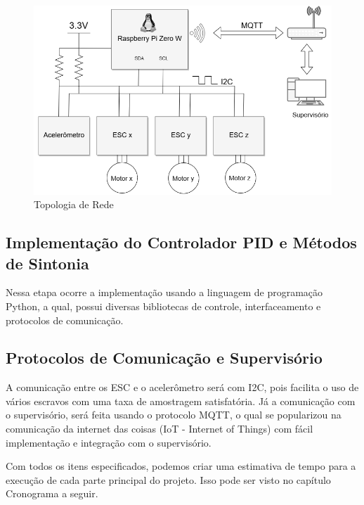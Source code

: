\begin{figure}[H]
  \caption{Topologia de Rede}
  \begin{center}
      \includegraphics[scale=.75]{img/comunicacao_projeto}
  \end{center}
  \label{fig:comunicacao_projeto}
\end{figure}

\subsection{Implementação do Controlador PID e Métodos de Sintonia}

Nessa etapa ocorre a implementação usando a linguagem de programação Python, a qual, possui diversas bibliotecas de controle, interfaceamento e protocolos de comunicação. 

\subsection{Protocolos de Comunicação e Supervisório}

A comunicação entre os ESC e o acelerômetro será com I2C, pois facilita o uso de vários escravos com uma taxa de amostragem satisfatória. Já a comunicação com o supervisório, será feita usando o protocolo MQTT, o qual se popularizou na comunicação da internet das coisas (IoT - Internet of Things) com fácil implementação e integração com o supervisório.

Com todos os itens especificados, podemos criar uma estimativa de tempo para a execução de cada parte principal do projeto. Isso pode ser visto no capítulo Cronograma a seguir.
